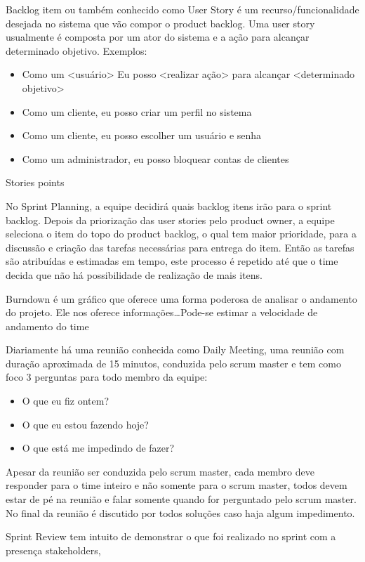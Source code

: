 \documentclass{abnt}
\begin{document}
		Backlog item ou também conhecido como User Story é um recurso/funcionalidade desejada no sistema que vão compor o
		product backlog. Uma user story usualmente é composta por um ator do sistema e a ação para alcançar determinado
		objetivo. Exemplos: 
			\begin{itemize}
				\item Como um <usuário> Eu posso <realizar ação> para alcançar <determinado objetivo>
				\item Como um cliente, eu posso criar um perfil no sistema
				\item Como um cliente, eu posso escolher um usuário e senha
				\item Como um administrador, eu posso bloquear contas de clientes
			\end{itemize}
				 
		Stories points
		
		No Sprint Planning, a equipe decidirá quais backlog itens irão para o sprint backlog. Depois da priorização das user
		stories pelo product owner, a equipe seleciona o item do topo do product backlog, o qual tem maior prioridade, para a
		discussão e criação das tarefas necessárias para entrega do item. Então as tarefas são atribuídas e estimadas em
		tempo, este processo é repetido até que o time decida que não há possibilidade de realização de mais itens.
		
				
		Burndown é um gráfico que oferece uma forma poderosa de analisar o andamento do projeto. Ele nos oferece
		informações\ldots Pode-se estimar a velocidade de andamento do time
		
		Diariamente há uma reunião conhecida como Daily Meeting, uma reunião com duração aproximada de 15 minutos,
		conduzida pelo scrum master e tem como foco 3 perguntas para todo membro da equipe:
			\begin{itemize}
				\item O que eu fiz ontem?
				\item O que eu estou fazendo hoje?
				\item O que está me impedindo de fazer?
			\end{itemize}
		
		Apesar da reunião ser conduzida pelo scrum master, cada membro deve responder para o time inteiro e não somente para o
		scrum master, todos devem estar de pé na reunião e falar somente quando for perguntado pelo scrum master. No final da
		reunião é discutido por todos soluções caso haja algum impedimento.
		
		Sprint Review tem intuito de demonstrar o que foi realizado no sprint com a presença stakeholders, 
		
\end{document}
